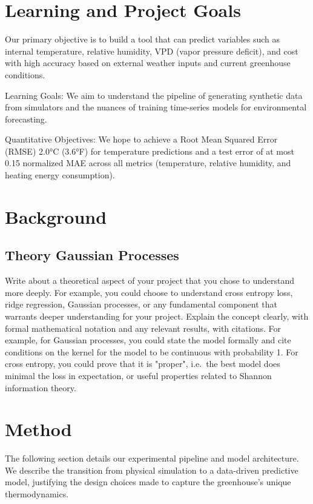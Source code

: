 \documentclass{article}
\begin{document}
\section{Learning and Project Goals}

Our primary objective is to build a tool that can predict variables such as internal temperature, relative humidity, VPD (vapor pressure deficit), and cost with high accuracy based on external weather inputs and current greenhouse conditions.

Learning Goals: We aim to understand the pipeline of generating synthetic data from simulators and the nuances of training time-series models for environmental forecasting. 

Quantitative Objectives: We hope to achieve a Root Mean Squared Error (RMSE) 2.0°C (3.6°F) for temperature predictions and a test error of at most 0.15 normalized MAE across all metrics (temperature, relative humidity, and heating energy consumption).

\section{Background}

\subsection{Theory Gaussian Processes}

Write about a theoretical aspect of your project that you chose to understand more deeply.
For example, you could choose to understand cross entropy loss, ridge regression, Gaussian processes, or any fundamental component that warrants deeper understanding for your project.
Explain the concept clearly, with formal mathematical notation and any relevant results, with citations.
For example, for Gaussian processes, you could state the model formally and cite conditions on the kernel for the model to be continuous with probability 1.  For cross entropy, you could prove that it is "proper", i.e.\ the best model does minimal the loss in expectation, or useful properties related to Shannon information theory.


\section{Method}
The following section details our experimental pipeline and model architecture. We describe the transition from physical simulation to a data-driven predictive model, justifying the design choices made to capture the greenhouse's unique thermodynamics.
\end{document}
